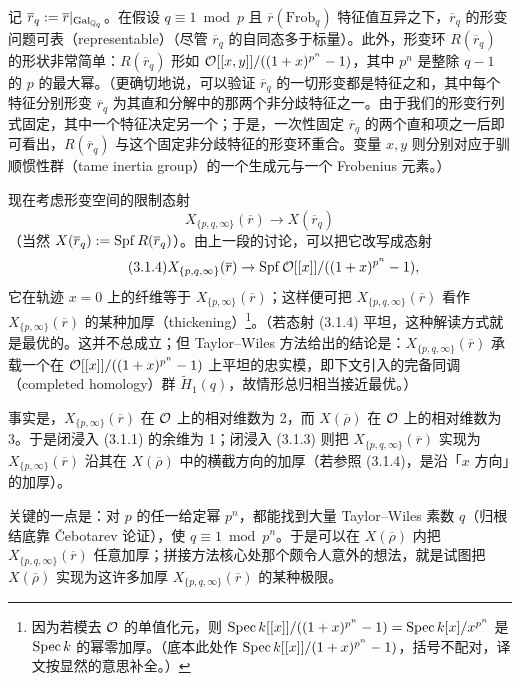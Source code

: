 记 $\overline{r}_q:=\overline{r}|_{\mathrm{Gal}_{\mathbb{Q}_q}}$。在假设 $q\equiv1\bmod p$ 且 $\overline{r}(\mathrm{Frob}_q)$ 特征值互异之下，$\overline{r}_q$ 的形变问题可表（representable）（尽管 $\overline{r}_q$ 的自同态多于标量）。此外，形变环 $R(\overline{r}_q)$ 的形状非常简单：$R(\overline{r}_q)$ 形如 $\mathcal{O}[[x,y]]/((1+x)^{p^n}-1)$，其中 $p^n$ 是整除 $q-1$ 的 $p$ 的最大幂。（更确切地说，可以验证 $\overline{r}_q$ 的一切形变都是特征之和，其中每个特征分别形变 $\overline{r}_q$ 为其直和分解中的那两个非分歧特征之一。由于我们的形变行列式固定，其中一个特征决定另一个；于是，一次性固定 $\overline{r}_q$ 的两个直和项之一后即可看出，$R(\overline{r}_q)$ 与这个固定非分歧特征的形变环重合。变量 $x,y$ 则分别对应于驯顺惯性群（tame inertia group）的一个生成元与一个 Frobenius 元素。）

现在考虑形变空间的限制态射
\[
X_{\{p,q,\infty\}}(\overline{r})\to X(\overline{r}_q)
\]
（当然 $X(\overline{r}_q):=\operatorname{Spf} R(\overline{r}_q)$）。由上一段的讨论，可以把它改写成态射
\begin{equation}
\tag{3.1.4}
X_{\{p,q,\infty\}}(\overline{r})\to\operatorname{Spf} \mathcal{O}[[x]]/((1+x)^{p^n}-1),
\end{equation}
它在轨迹 $x=0$ 上的纤维等于 $X_{\{p,\infty\}}(\overline{r})$；这样便可把 $X_{\{p,q,\infty\}}(\overline{r})$ 看作 $X_{\{p,\infty\}}(\overline{r})$ 的某种加厚（thickening）\footnote{因为若模去 $\mathcal{O}$ 的单值化元，则 $\operatorname{Spec} k[[x]]/((1+x)^{p^n}-1)=\operatorname{Spec} k[x]/x^{p^n}$ 是 $\operatorname{Spec} k$ 的幂零加厚。（底本此处作 $\operatorname{Spec} k[[x]]/(1+x)^{p^n}-1)$，括号不配对，译文按显然的意思补全。）}。（若态射 (3.1.4) 平坦，这种解读方式就是最优的。这并不总成立；但 Taylor--Wiles 方法给出的结论是：$X_{\{p,q,\infty\}}(\overline{r})$ 承载一个在 $\mathcal{O}[[x]]/((1+x)^{p^n}-1)$ 上平坦的忠实模，即下文引入的完备同调（completed homology）群 $\widetilde{H}_1(q)$，故情形总归相当接近最优。）

事实是，$X_{\{p,\infty\}}(\overline{r})$ 在 $\mathcal{O}$ 上的相对维数为 2，而 $X(\overline{\rho})$ 在 $\mathcal{O}$ 上的相对维数为 3。于是闭浸入 (3.1.1) 的余维为 1；闭浸入 (3.1.3) 则把 $X_{\{p,q,\infty\}}(\overline{r})$ 实现为 $X_{\{p,\infty\}}(\overline{r})$ 沿其在 $X(\overline{\rho})$ 中的横截方向的加厚（若参照 (3.1.4)，是沿「$x$ 方向」的加厚）。

关键的一点是：对 $p$ 的任一给定幂 $p^n$，都能找到大量 Taylor--Wiles 素数 $q$（归根结底靠 Čebotarev 论证），使 $q\equiv1\bmod p^n$。于是可以在 $X(\overline{\rho})$ 内把 $X_{\{p,q,\infty\}}(\overline{r})$ 任意加厚；拼接方法核心处那个颇令人意外的想法，就是试图把 $X(\overline{\rho})$ 实现为这许多加厚 $X_{\{p,q,\infty\}}(\overline{r})$ 的某种极限。

